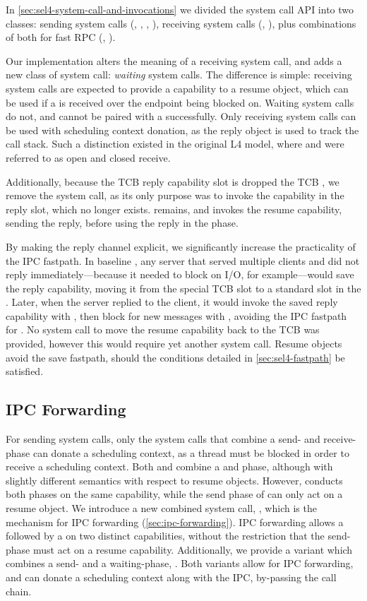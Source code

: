 In \cref{sec:sel4-system-call-and-invocations} we divided the \selfour system call API into two
classes: sending system calls (\send, \nbsend, \call, \reply),
receiving system calls (\recv, \nbrecv), plus combinations of both for fast 
RPC (\call, \replyrecv).  

Our implementation alters the meaning of a receiving system call, and adds a new class of system
call: \emph{waiting} system calls. The difference is simple: receiving system calls are expected to
provide a capability to a resume object, which can be used if a \call is received over
the endpoint being blocked on. Waiting system calls do not, and cannot be paired with a \call
successfully. Only receiving system calls can be used with scheduling context donation, as the reply
object is used to track the call stack. Such a distinction existed in the original L4 model, where
and were referred to as open and closed receive.

Additionally, because the TCB reply capability slot is dropped the \gls{TCB} \cnode, we remove the \reply 
system call, as its only purpose was to invoke the capability in the reply slot, which no longer exists.
\replyrecv remains, and invokes the resume capability, sending the reply, before using the
reply in the \recv phase. 

By making the reply channel explicit, we significantly increase the practicality of the IPC
fastpath. In baseline \selfour, any server that served multiple clients and did not reply
immediately---because it needed to block on I/O, for example---would save the reply
capability, moving it from the special TCB slot to a standard slot in the \cspace. Later, when
the server replied to the client, it would invoke the saved reply capability with \send, then block
for new messages with \recv, avoiding the IPC fastpath for \replyrecv. No system call to move the 
resume capability back to the \gls{TCB} \cnode was provided, however this would require yet another
system call. Resume objects avoid the save
fastpath, should the conditions detailed in \cref{sec:sel4-fastpath} be satisfied.

\subsection{IPC Forwarding}

For sending system calls, only the system calls that combine a send- and receive-phase can donate
a scheduling context, as a thread must be blocked in order to receive a scheduling context. Both
\call and \replyrecv combine a \send and \recv phase, although with slightly different semantics
with respect to resume objects. However, \call conducts both phases on the same capability, while
the send phase of \replyrecv can only act on a resume object. We introduce a new combined system
call, \nbsendrecv, which is the mechanism for IPC forwarding (\cref{sec:ipc-forwarding}). 
IPC forwarding allows a \nbsend followed by a \recv on two distinct capabilities, without the
restriction that the send-phase must act on a resume capability. 
Additionally, we provide a variant which combines a send- and a waiting-phase, \nbsendwait.
Both variants allow for IPC forwarding, and can donate a scheduling context
along with the IPC, by-passing the call chain. 

